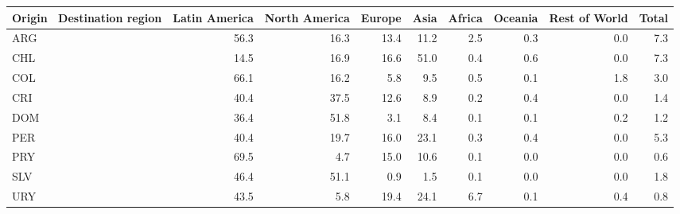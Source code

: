 \begin{tabular}{lrrrrrrrr}
\toprule
Origin \ Destination region & Latin America & North America & Europe & Asia & Africa & Oceania & Rest of World & Total \\
\midrule
ARG & 56.3 & 16.3 & 13.4 & 11.2 & 2.5 & 0.3 & 0.0 & 7.3 \\
CHL & 14.5 & 16.9 & 16.6 & 51.0 & 0.4 & 0.6 & 0.0 & 7.3 \\
COL & 66.1 & 16.2 & 5.8 & 9.5 & 0.5 & 0.1 & 1.8 & 3.0 \\
CRI & 40.4 & 37.5 & 12.6 & 8.9 & 0.2 & 0.4 & 0.0 & 1.4 \\
DOM & 36.4 & 51.8 & 3.1 & 8.4 & 0.1 & 0.1 & 0.2 & 1.2 \\
PER & 40.4 & 19.7 & 16.0 & 23.1 & 0.3 & 0.4 & 0.0 & 5.3 \\
PRY & 69.5 & 4.7 & 15.0 & 10.6 & 0.1 & 0.0 & 0.0 & 0.6 \\
SLV & 46.4 & 51.1 & 0.9 & 1.5 & 0.1 & 0.0 & 0.0 & 1.8 \\
URY & 43.5 & 5.8 & 19.4 & 24.1 & 6.7 & 0.1 & 0.4 & 0.8 \\
\bottomrule
\end{tabular}
